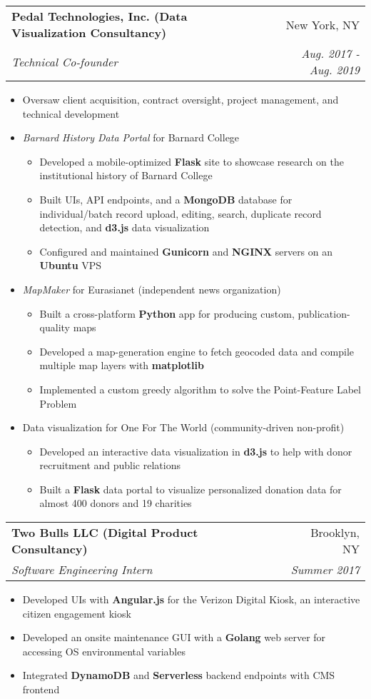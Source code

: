 \documentclass[letterpaper,11pt]{article}
\makeatletter
\newcommand{\resumeItemNoTitle}[1]{\item\small #1 \vspace{-2pt}}
\newcommand{\resumeSubheading}[4]{
  \vspace{-1pt}\item
    \begin{tabular*}{0.97\textwidth}[t]{l@{\extracolsep{\fill}}r}
      \textbf{#1} & #2 \\
      \textit{\small#3} & \textit{\small #4} \\
    \end{tabular*}\vspace{-5pt}
}
\newcommand{\resumeItemListStart}{\begin{itemize}}
\newcommand{\resumeListEnd}{\end{itemize}}
\makeatother
\begin{document}
    \resumeSubheading
      {Pedal Technologies, Inc. (Data Visualization Consultancy)}{New York, NY}
      {Technical Co-founder}{Aug. 2017 - Aug. 2019}
    \resumeItemListStart
      \resumeItemNoTitle {Oversaw client acquisition, contract oversight, project management, and technical development}
      \resumeItemNoTitle {\textit{Barnard History Data Portal} for Barnard College}
        \resumeItemListStart
          \resumeItemNoTitle {Developed a mobile-optimized \textbf{Flask} site to showcase research on the institutional history of Barnard College}
          \resumeItemNoTitle {Built UIs, API endpoints, and a \textbf{MongoDB} database for individual/batch record upload, editing, search, duplicate record detection, and \textbf{d3.js} data visualization}
          \resumeItemNoTitle {Configured and maintained \textbf{Gunicorn} and \textbf{NGINX} servers on an \textbf{Ubuntu} VPS}
        \end{itemize}
      \resumeItemNoTitle {\textit{MapMaker} for Eurasianet (independent news organization)}
        \resumeItemListStart
          \resumeItemNoTitle {Built a cross-platform \textbf{Python} app for producing custom, publication-quality maps}
          \resumeItemNoTitle {Developed a map-generation engine to fetch geocoded data and compile multiple map layers with \textbf{matplotlib} }
          \resumeItemNoTitle {Implemented a custom greedy algorithm to solve the Point-Feature Label Problem}
        \end{itemize}
      \resumeItemNoTitle {Data visualization for One For The World (community-driven non-profit)}
        \resumeItemListStart
          \resumeItemNoTitle {Developed an interactive data visualization in \textbf{d3.js} to help with donor recruitment and public relations}
          \resumeItemNoTitle {Built a \textbf{Flask} data portal to visualize personalized donation data for almost 400 donors and 19 charities}
        \resumeListEnd
    \resumeListEnd

    \resumeSubheading
      {Two Bulls LLC (Digital Product Consultancy)}{Brooklyn, NY}
      {Software Engineering Intern}{Summer 2017}
      \resumeItemListStart
        \resumeItemNoTitle {Developed UIs with \textbf{Angular.js} for the Verizon Digital Kiosk, an interactive citizen engagement kiosk}
        \resumeItemNoTitle {Developed an onsite maintenance GUI with a \textbf{Golang} web server for accessing OS environmental variables}
        \resumeItemNoTitle {Integrated \textbf{DynamoDB} and \textbf{Serverless} backend endpoints with CMS frontend}
      \resumeListEnd
\end{document}

